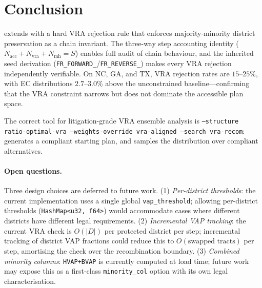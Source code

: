 \section{Conclusion}
\label{sec:conclusion}

\vr{} extends \fr{} with a hard VRA rejection rule that enforces majority-minority
district preservation as a chain invariant.
The three-way step accounting identity ($N_{\mathrm{acc}} + N_{\mathrm{vra}} +
N_{\mathrm{mh}} = S$) enables full audit of chain behaviour, and the inherited
\fr{} seed derivation (\texttt{FR\_FORWARD\_}/\texttt{FR\_REVERSE\_}) makes
every VRA rejection independently verifiable.
On NC, GA, and TX, VRA rejection rates are $15$--$25\%$, with EC distributions
$2.7$--$3.0\%$ above the unconstrained baseline---confirming that the VRA
constraint narrows but does not dominate the accessible plan space.

The correct tool for litigation-grade VRA ensemble analysis is
\texttt{--structure ratio-optimal-vra --weights-override vra-aligned
--search vra-recom}: \vraSection{} generates a compliant starting plan,
and \vr{} samples the distribution over compliant alternatives.

\paragraph{Open questions.}
Three design choices are deferred to future work.
(1) \emph{Per-district thresholds}: the current implementation uses a single
global \texttt{vap\_threshold}; allowing per-district thresholds
(\texttt{HashMap<u32, f64>}) would accommodate cases where different districts
have different legal requirements.
(2) \emph{Incremental VAP tracking}: the current VRA check is $O(|D|)$ per
protected district per step; incremental tracking of district VAP fractions
could reduce this to $O(\text{swapped tracts})$ per step, amortising the
check over the recombination boundary.
(3) \emph{Combined minority columns}: \texttt{HVAP+BVAP} is currently computed
at load time; future work may expose this as a first-class \texttt{minority\_col}
option with its own legal characterisation.
